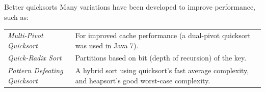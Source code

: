 \begin{sidenotebox}{Better quicksorts}
    Many variations have been developed to improve performance, such as:
    \\\begin{tabular}{l p{}}
        \textit{Multi-Pivot Quicksort}       & For improved cache performance (a dual-pivot quicksort was used in Java 7).                         \\
        \textit{Quick-Radix Sort}            & Partitions based on bit (depth of recursion) of the key.                                            \\
        \textit{Pattern Defeating Quicksort} & A hybrid sort using quicksort's fast average complexity, and heapsort's good worst-case complexity. \\
    \end{tabular}
\end{sidenotebox}
